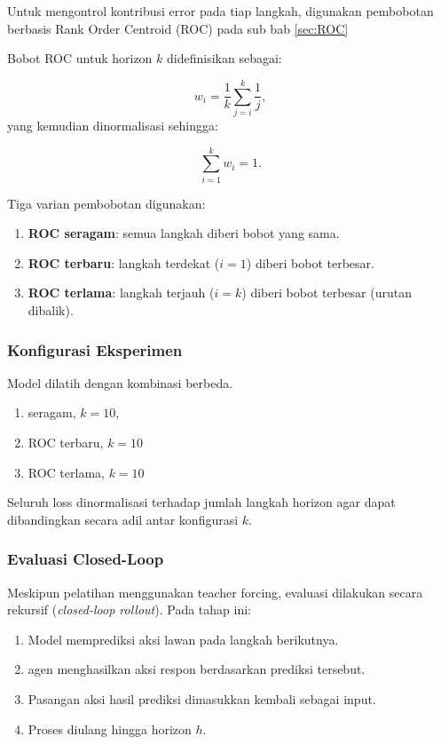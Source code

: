 Untuk mengontrol kontribusi error pada tiap langkah, digunakan pembobotan berbasis Rank Order Centroid (ROC) pada sub bab \ref{sec:ROC}

Bobot ROC untuk horizon $k$ didefinisikan sebagai:

\begin{equation}
w_i
=
\frac{1}{k}
\sum_{j=i}^{k}
\frac{1}{j},    
\end{equation}
\noindent
yang kemudian dinormalisasi sehingga:

\begin{equation}
   \sum_{i=1}^{k} w_i = 1. 
\end{equation}


\noindent
Tiga varian pembobotan digunakan:

\begin{enumerate}
    \item \textbf{ROC seragam}: semua langkah diberi bobot yang sama.
    \item \textbf{ROC terbaru}: langkah terdekat ($i=1$) diberi bobot terbesar.
    \item \textbf{ROC terlama}: langkah terjauh ($i=k$) diberi bobot terbesar (urutan dibalik).
\end{enumerate}

\subsubsection{Konfigurasi Eksperimen}

Model dilatih dengan kombinasi berbeda.

\begin{enumerate}
    \item seragam, $k = 10$, 
    \item ROC terbaru, $k = 10$
    \item ROC terlama, $k = 10$
\end{enumerate}

Seluruh loss dinormalisasi terhadap jumlah langkah horizon agar dapat dibandingkan secara adil antar konfigurasi $k$.

\subsubsection{Evaluasi Closed-Loop}

Meskipun pelatihan menggunakan teacher forcing, evaluasi dilakukan secara rekursif (\textit{closed-loop rollout}). Pada tahap ini:

\begin{enumerate}
    \item Model memprediksi aksi lawan pada langkah berikutnya.
    \item agen menghasilkan aksi respon berdasarkan prediksi tersebut.
    \item Pasangan aksi hasil prediksi dimasukkan kembali sebagai input.
    \item Proses diulang hingga horizon $h$.
\end{enumerate}

